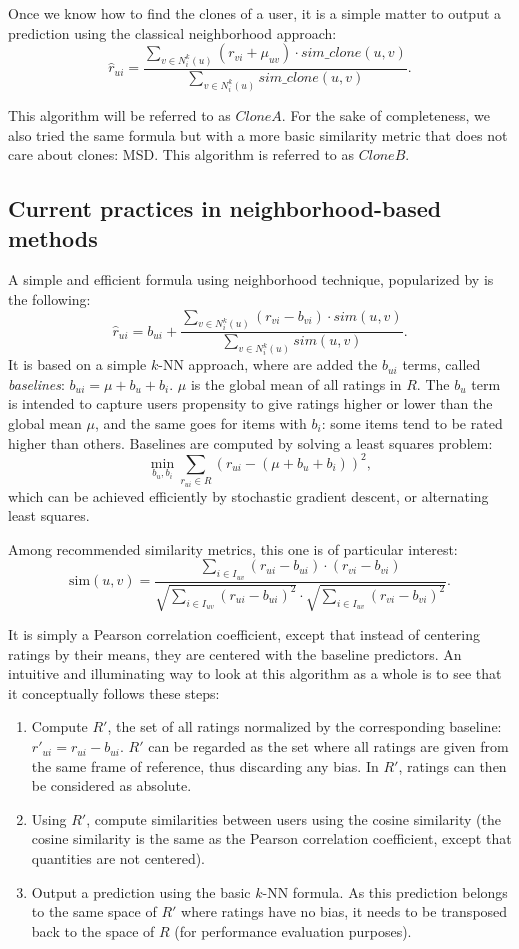 \documentclass[conference]{IEEEtran}
\newcommand{\predr}[1]{\hat{r}_{#1}}
\begin{document}
Once we know how to find the clones of a user, it is a simple matter to output
a prediction using the classical neighborhood approach:
$$\predr{ui} = \frac{\sum_{v \in N_i^k(u)} (r_{vi} + \mu_{uv}) \cdot sim\_clone(u,
v)}{\sum_{v \in N_i^k(u)} sim\_clone(u, v)}.$$

This algorithm will be referred to as $CloneA$. For the sake of completeness,
we also tried the same formula but with a more basic similarity metric that
does not care about clones: MSD. This algorithm is referred to as $CloneB$.

\subsection{Current practices in neighborhood-based methods}

A simple and efficient formula using neighborhood technique, popularized by
\cite{Koren:2010:FNS:1644873.1644874} is the following:
$$\predr{ui} = b_{ui} + \frac{\sum_{v \in N_i^k(u)} (r_{vi} - b_{vi}) \cdot
sim(u, v)} {\sum_{v \in N_i^k(u)}sim(u, v)}.$$
It is based on a simple $k$-NN approach, where are added the $b_{ui}$ terms,
called \textit{baselines}: $b_{ui} = \mu + b_u + b_i$. $\mu$ is the global mean
of all ratings in $R$. The $b_u$ term is intended to capture users propensity
to give ratings higher or lower than the global mean $\mu$, and the same goes
for items with $b_i$: some items tend to be rated higher than others. Baselines
are computed by solving a least squares problem:
$$ \min\limits_{b_u, b_i} \sum_{r_{ui} \in R} (r_{ui} - (\mu + b_u + b_i))^2,$$
which can be achieved efficiently by stochastic gradient descent, or
alternating least squares.

Among recommended similarity metrics, this one is of particular interest:
$$\text{sim}(u, v) = \frac
{ \sum\limits_{i \in I_{uv}} (r_{ui} -  b_{ui}) \cdot (r_{vi} - b_{vi})}
{\sqrt{\sum\limits_{i \in I_{uv}} (r_{ui} -  b_{ui})^2} \cdot
\sqrt{\sum\limits_{i \in I_{uv}} (r_{vi} -  b_{vi})^2}}.$$

It is simply a Pearson correlation coefficient, except that instead of
centering ratings by their means, they are centered with the baseline
predictors. An intuitive and illuminating way to look at this algorithm as a
whole is to see that it conceptually follows these steps:
\begin{enumerate}
  \item Compute $R'$, the set of all ratings normalized by the corresponding
    baseline: $r'_{ui} = r_{ui} - b_{ui}$.  $R'$ can be regarded as the set
    where all ratings are given from the same frame of reference, thus
    discarding any bias.  In $R'$, ratings can then be considered as absolute.
  \item Using $R'$, compute similarities between users using the cosine similarity (the
    cosine similarity is the same as the Pearson correlation coefficient,
    except that quantities are not centered).
  \item Output a prediction using the basic $k$-NN formula. As this prediction
    belongs to the same space of $R'$ where ratings have no bias, it needs to
    be transposed back to the space of $R$ (for performance evaluation
    purposes).
\end{enumerate}
\end{document}
